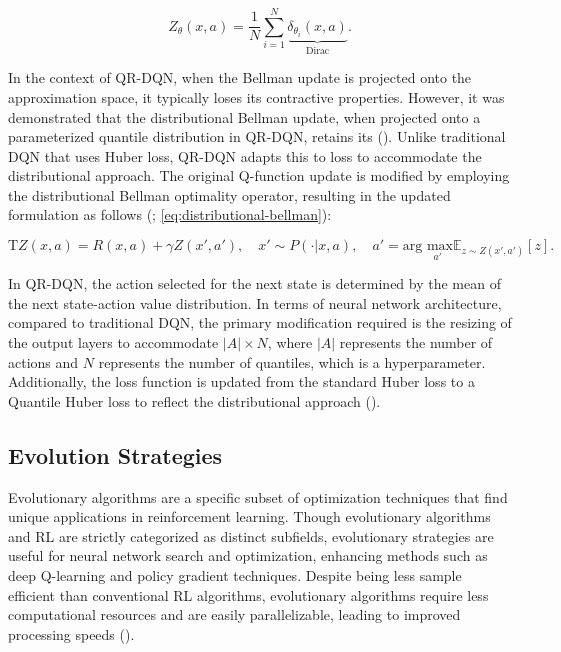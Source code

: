             \begin{equation}
                Z_\theta(x, a) = \frac{1}{N} \sum_{i=1}^{N} \underbrace{\delta_{\theta_i}(x, a)}_{\text{Dirac}}.
                \label{eq:parametric-z-variable}
            \end{equation}
            
            \noindent In the context of QR-DQN, when the Bellman update is projected onto the approximation space, it typically loses its contractive properties. However, it was demonstrated that the distributional Bellman update, when projected onto a parameterized quantile distribution in QR-DQN, retains its  (\textcolor{deepblue}{\cite{bellemare2017distributional}}). Unlike traditional DQN that uses Huber loss, QR-DQN adapts this to  loss to accommodate the distributional approach. The original Q-function update is modified by employing the distributional Bellman optimality operator, resulting in the updated formulation as follows (\textcolor{deepblue}{\cite{dabney2017distributional}; \autoref{eq:distributional-bellman}}):
            
            \begin{equation}
                \mathrm{T} Z(x, a) = R(x, a) + \gamma Z(x', a'), \quad x' \sim P(\cdot|x, a), \quad a' = \text{arg}\underset{a'}{\text{ max}} \mathbb{E}_{z \sim Z(x', a')} \left[  z \right].
                \label{eq:distributional-bellman}
            \end{equation}
            
            \noindent In QR-DQN, the action selected for the next state is determined by the mean of the next state-action value distribution. In terms of neural network architecture, compared to traditional DQN, the primary modification required is the resizing of the output layers to accommodate $|A| \times N$, where $|A|$ represents the number of actions and $N$ represents the number of quantiles, which is a hyperparameter. Additionally, the loss function is updated from the standard Huber loss to a Quantile Huber loss to reflect the distributional approach (\textcolor{deepblue}{\cite{yang2020fully}}).

    \subsection{Evolution Strategies}
    \label{subsec:evol}

        \noindent Evolutionary algorithms are a specific subset of optimization techniques that find unique applications in reinforcement learning. Though evolutionary algorithms and RL are strictly categorized as distinct subfields, evolutionary strategies are useful for neural network search and optimization, enhancing methods such as deep Q-learning and policy gradient techniques. Despite being less sample efficient than conventional RL algorithms, evolutionary algorithms require less computational resources and are easily parallelizable, leading to improved processing speeds (\textcolor{deepblue}{\cite{Yanes2021}}). 
        
